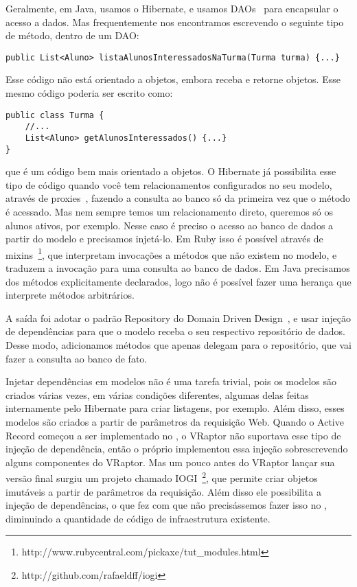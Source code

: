 Geralmente, em Java, usamos o Hibernate, e usamos DAOs~\cite{dao} para encapsular o acesso a dados. Mas frequentemente nos encontramos escrevendo o seguinte tipo de método, dentro de um DAO:

\begin{lstlisting}
public List<Aluno> listaAlunosInteressadosNaTurma(Turma turma) {...}
\end{lstlisting}

Esse código não está orientado a objetos, embora receba e retorne objetos. Esse mesmo código poderia ser escrito como:

\begin{lstlisting}
public class Turma {
	//...
	List<Aluno> getAlunosInteressados() {...}
}
\end{lstlisting}

que é um código bem mais orientado a objetos. O Hibernate já possibilita esse tipo de código quando você tem relacionamentos configurados no seu modelo, através de proxies~\cite{gof}, fazendo a consulta ao banco só da primeira vez que o método é acessado. Mas nem sempre temos um relacionamento direto, queremos só os alunos ativos, por exemplo. Nesse caso é preciso o acesso ao banco de dados a partir do modelo e precisamos injetá-lo. Em Ruby isso é possível através de mixins~\footnote{http://www.rubycentral.com/pickaxe/tut\_modules.html}, que interpretam invocações a métodos que não existem no modelo, e traduzem a invocação para uma consulta ao banco de dados. Em Java precisamos dos métodos explicitamente declarados, logo não é possível fazer uma herança que interprete métodos arbitrários.

A saída foi adotar o padrão Repository do Domain Driven Design~\cite{ddd}, e usar injeção de dependências para que o modelo receba o seu respectivo repositório de dados. Desse modo, adicionamos métodos que apenas delegam para o repositório, que vai fazer a consulta ao banco de fato.

Injetar dependências em modelos não é uma tarefa trivial, pois os modelos são criados várias vezes, em várias condições diferentes, algumas delas feitas internamente pelo Hibernate para criar listagens, por exemplo. Além disso, esses modelos são criados a partir de parâmetros da requisição Web. Quando o Active Record começou a ser implementado no \calopsita, o VRaptor não suportava esse tipo de injeção de dependência, então o próprio \calopsita implementou essa injeção sobrescrevendo alguns componentes do VRaptor. Mas um pouco antes do VRaptor lançar sua versão final surgiu um projeto \opensource chamado IOGI~\footnote{http://github.com/rafaeldff/iogi}, que permite criar objetos imutáveis a partir de parâmetros da requisição. Além disso ele possibilita a injeção de dependências, o que fez com que não precisássemos fazer isso no \calopsita, diminuindo a quantidade de código de infraestrutura existente.

